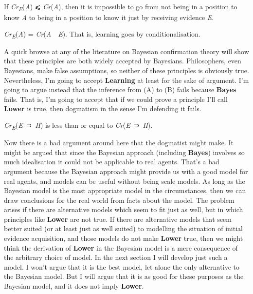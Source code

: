 \documentclass[
  10pt,
  letterpaper,
  DIV=11,
  numbers=noendperiod,
  twoside]{scrartcl}
\providecommand{\tightlist}{%
  \setlength{\itemsep}{0pt}\setlength{\parskip}{0pt}}\usepackage{longtable,booktabs,array}
\begin{document}
\begin{description}
\tightlist
\item[Learning]
If \emph{Cr\textsubscript{E}}(\emph{A}) ⩽ \emph{Cr}(\emph{A}), then it
is impossible to go from not being in a position to know \emph{A} to
being in a position to know it just by receiving evidence \emph{E}.
\item[Bayes]
\emph{Cr\textsubscript{E}}(\emph{A}) =
\emph{Cr}(\emph{A}~\textbar~\emph{E}). That is, learning goes by
conditionalisation.
\end{description}

A quick browse at any of the literature on Bayesian confirmation theory
will show that these principles are both widely accepted by Bayesians.
Philosophers, even Bayesians, make false assumptions, so neither of
these principles is obviously true. Nevertheless, I'm going to accept
\textbf{Learning} at least for the sake of argument. I'm going to argue
instead that the inference from (A) to (B) fails because \textbf{Bayes}
fails. That is, I'm going to accept that if we could prove a principle
I'll call \textbf{Lower} is true, then dogmatism in the sense I'm
defending it fails.

\begin{description}
\tightlist
\item[Lower]
\emph{Cr\textsubscript{E}}(\emph{E}~⊃~\emph{H}) is less than or equal to
\emph{Cr}(\emph{E}~⊃~\emph{H}).
\end{description}

Now there is a bad argument around here that the dogmatist might make.
It might be argued that since the Bayesian approach (including
\textbf{Bayes}) involves so much idealisation it could not be applicable
to real agents. That's a bad argument because the Bayesian approach
might provide us with a good model for real agents, and models can be
useful without being scale models. As long as the Bayesian model is the
most appropriate model in the circumstances, then we can draw
conclusions for the real world from facts about the model. The problem
arises if there are alternative models which seem to fit just as well,
but in which principles like \textbf{Lower} are not true. If there are
alternative models that seem better suited (or at least just as well
suited) to modelling the situation of initial evidence acquisition, and
those models do not make \textbf{Lower} true, then we might think the
derivation of \textbf{Lower} in the Bayesian model is a mere consequence
of the arbitrary choice of model. In the next section I will develop
just such a model. I won't argue that it is the best model, let alone
the only alternative to the Bayesian model. But I will argue that it is
as good for these purposes as the Bayesian model, and it does not imply
\textbf{Lower}.
\end{document}
